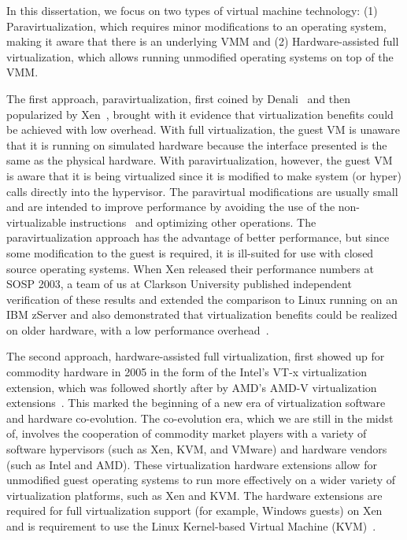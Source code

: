 In this dissertation, we focus on two types of virtual machine technology: (1) Paravirtualization, which requires minor modifications to an operating system, making it aware that there is an underlying VMM and (2) Hardware-assisted full virtualization, which allows running unmodified operating systems on top of the VMM.

The first approach, paravirtualization, first coined by Denali~\cite{whitaker_2002} and then popularized by Xen~\cite{barham_2003}, brought with it evidence that virtualization benefits could be achieved with low overhead. With full virtualization, the guest VM is unaware that it is running on simulated hardware because the interface presented is the same as the physical hardware. With paravirtualization, however, the guest VM is aware that it is being virtualized since it is modified to make system (or hyper) calls directly into the hypervisor. The paravirtual modifications are usually small and are intended to improve performance by avoiding the use of the non-virtualizable instructions~\cite{popek_1974} and optimizing other operations. The paravirtualization approach has the advantage of better performance, but since some modification to the guest is required, it is ill-suited for use with closed source operating systems. When Xen released their performance numbers at SOSP 2003, a team of us at Clarkson University published independent verification of these results and extended the comparison to Linux running on an IBM zServer and also demonstrated that virtualization benefits could be realized on older hardware, with a low performance overhead~\cite{clark_2004}.
 
The second approach, hardware-assisted full virtualization, first showed up for commodity hardware in 2005 in the form of the Intel's VT-x virtualization extension, which was followed shortly after by AMD's AMD-V virtualization extensions~\cite{van_Doorn_2006}. This marked the beginning of a new era of virtualization software and hardware co-evolution. The co-evolution era, which we are still in the midst of, involves the cooperation of commodity market players with a variety of software hypervisors (such as Xen, KVM, and VMware) and hardware vendors (such as Intel and AMD). These virtualization hardware extensions allow for unmodified guest operating systems to run more effectively on a wider variety of virtualization platforms, such as Xen and KVM. The hardware extensions are required for full virtualization support (for example, Windows guests) on Xen and is requirement to use the Linux Kernel-based Virtual Machine (KVM)~\cite{kvm_ols07}.

